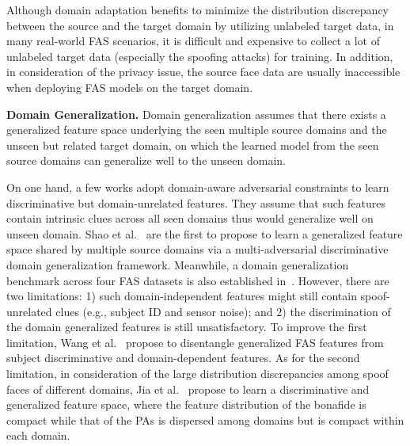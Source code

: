 \documentclass[10pt,journal,compsoc]{IEEEtran}
\begin{document}
Although domain adaptation benefits to minimize the distribution discrepancy between the source and the target domain by utilizing unlabeled target data, in many real-world FAS scenarios, it is difficult and expensive to collect a lot of unlabeled target data (especially the spoofing attacks) for training. In addition, in consideration of the privacy issue, the source face data are usually inaccessible when deploying FAS models  on the target domain.






\vspace{0.4em}
\noindent\textbf{Domain Generalization.}\quad   
Domain generalization assumes that there exists a generalized feature space underlying the seen multiple source domains and the unseen but related target domain, on which the learned model from the seen source domains can generalize well to the unseen domain.

On one hand, a few works adopt domain-aware adversarial constraints to learn discriminative but domain-unrelated features. They assume that such features contain intrinsic clues across all seen domains thus would generalize well on unseen domain. Shao et al.~\cite{shao2019multi} are the first to propose to learn a generalized feature space shared by multiple source domains via a multi-adversarial discriminative domain generalization framework. Meanwhile, a domain generalization benchmark across four FAS datasets is also established in~\cite{shao2019multi}. However, there are two limitations: 1) such domain-independent features might still contain spoof-unrelated clues (e.g., subject ID and sensor noise); and 2) the discrimination of the domain generalized features is still unsatisfactory. To improve the first limitation, Wang et al.~\cite{wang2020cross} propose to disentangle generalized FAS features from subject discriminative and domain-dependent features. As for the second limitation, in consideration of the large distribution discrepancies among spoof faces of different domains, Jia et al.~\cite{jia2020single} propose to learn a discriminative and generalized feature space, where the feature distribution of the bonafide is compact while that of the PAs is dispersed among domains but is compact within each domain.
\end{document}
